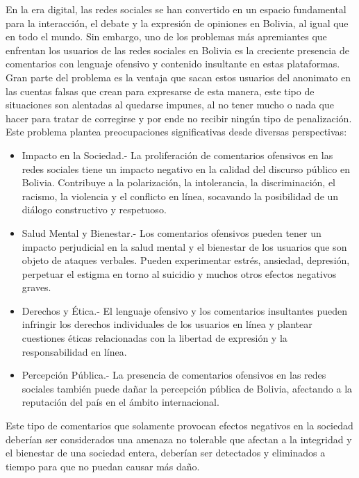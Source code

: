 En la era digital, las redes sociales se han convertido en un espacio fundamental para la interacción, el debate y la expresión de opiniones en Bolivia, al igual que en todo el mundo. Sin embargo, uno de los problemas más apremiantes que enfrentan los usuarios de las redes sociales en Bolivia es la creciente presencia de comentarios con lenguaje ofensivo y contenido insultante en estas plataformas. Gran parte del problema es la ventaja que sacan estos usuarios del anonimato en las cuentas falsas que crean para expresarse de esta manera, este tipo de situaciones son alentadas al quedarse impunes, al no tener mucho o nada que hacer para tratar de corregirse y por ende no recibir ningún tipo de penalización.
Este problema plantea preocupaciones significativas desde diversas perspectivas:
\begin{itemize}
	\item	Impacto en la Sociedad.- La proliferación de comentarios ofensivos en las redes sociales tiene un impacto negativo en la calidad del discurso público en Bolivia. Contribuye a la polarización, la intolerancia, la discriminación, el racismo, la violencia y el conflicto en línea, socavando la posibilidad de un diálogo constructivo y respetuoso.
	\item Salud Mental y Bienestar.- Los comentarios ofensivos pueden tener un impacto perjudicial en la salud mental y el bienestar de los usuarios que son objeto de ataques verbales. Pueden experimentar estrés, ansiedad,  depresión, perpetuar el estigma en torno al suicidio y muchos otros efectos negativos graves.
	\item Derechos y Ética.- El lenguaje ofensivo y los comentarios insultantes pueden infringir los derechos individuales de los usuarios en línea y plantear cuestiones éticas relacionadas con la libertad de expresión y la responsabilidad en línea.
	\item Percepción Pública.- La presencia de comentarios ofensivos en las redes sociales también puede dañar la percepción pública de Bolivia, afectando a la reputación del país en el ámbito internacional.	
\end{itemize}
Este tipo de comentarios que solamente provocan efectos negativos en la sociedad deberían ser considerados una amenaza no tolerable que afectan a la integridad y el bienestar de una sociedad entera, deberían ser detectados y eliminados a tiempo para que no puedan causar más daño.